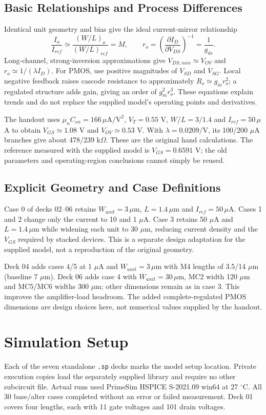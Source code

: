 \subsection{Basic Relationships and Process Differences}
Identical unit geometry and bias give the ideal current-mirror relationship
\[
\frac{I_o}{I_{ref}}\simeq\frac{(W/L)_o}{(W/L)_{ref}}=M,
\qquad r_o=\left(\frac{\partial I_D}{\partial V_{DS}}\right)^{-1}=\frac{1}{g_{ds}}.
\]
Long-channel, strong-inversion approximations give $V_{DS,min}\simeq V_{OV}$ and $r_o\simeq1/(\lambda I_D)$. For PMOS, use positive magnitudes of $V_{SD}$ and $V_{SG}$. Local negative feedback raises cascode resistance to approximately $R_o\simeq g_mr_o^2$; a regulated structure adds gain, giving an order of $g_m^2r_o^3$. These equations explain trends and do not replace the supplied model's operating points and derivatives.

The handout uses $\mu_n C_{ox}=166\,\mu\mathrm{A}/\mathrm{V}^2$, $V_T=0.55$ V, $W/L=3/1.4$ and $I_{ref}=50\,\mu$A to obtain $V_{GS}\simeq1.08$ V and $V_{OV}\simeq0.53$ V. With $\lambda=0.0209/\mathrm{V}$, its 100/200 $\mu$A branches give about 478/239 k$\Omega$. These are the original hand calculations. The reference measured with the supplied model is $V_{GS}=0.6591$ V; the old parameters and operating-region conclusions cannot simply be reused.

\subsection{Explicit Geometry and Case Definitions}
Case 0 of decks 02--06 retains $W_{unit}=3\,\mu$m, $L=1.4\,\mu$m and $I_{ref}=50\,\mu$A. Cases 1 and 2 change only the current to 10 and 1 $\mu$A. Case 3 retains 50 $\mu$A and $L=1.4\,\mu$m while widening each unit to 30 $\mu$m, reducing current density and the $V_{GS}$ required by stacked devices. This is a separate design adaptation for the supplied model, not a reproduction of the original geometry.

Deck 04 adds cases 4/5 at 1 $\mu$A and $W_{unit}=3\,\mu$m with M4 lengths of 3.5/14 $\mu$m (baseline 7 $\mu$m). Deck 06 adds case 4 with $W_{unit}=30\,\mu$m, MC2 width 120 $\mu$m and MC5/MC6 widths 300 $\mu$m; other dimensions remain as in case 3. This improves the amplifier-load headroom. The added complete-regulated PMOS dimensions are design choices here, not numerical values supplied by the handout.

\section{Simulation Setup}
Each of the seven standalone \texttt{.sp} decks marks the model setup location. Private execution copies load the separately supplied library and require no other subcircuit file. Actual runs used PrimeSim HSPICE S-2021.09 win64 at 27 $^\circ$C. All 30 base/alter cases completed without an error or failed measurement. Deck 01 covers four lengths, each with 11 gate voltages and 101 drain voltages.


